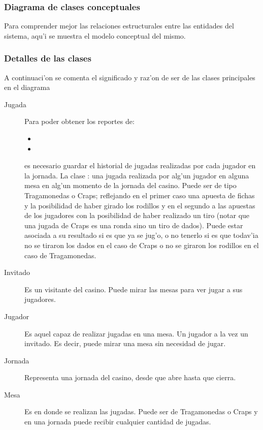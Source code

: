 \subsubsection{Diagrama de clases conceptuales}
Para comprender mejor las relaciones estructurales entre las entidades del sistema, aqu'i se muestra el modelo conceptual del mismo. 



\subsubsection{Detalles de las clases}
A continuaci'on se comenta el significado y raz'on de ser de las clases principales en el diagrama
\begin{description}
\item [Jugada] Para poder obtener los reportes de:
\begin{itemize}
 \item {} 
\item {} 
\end{itemize}
 es necesario guardar el historial de jugadas realizadas por cada jugador en la jornada. 
La clase : una jugada realizada por alg'un jugador en alguna mesa en alg'un momento de la jornada del casino. Puede ser de tipo Tragamonedas o Craps; reflejando en el primer caso una apuesta de fichas y la posibilidad de haber girado los rodillos y en el segundo a las apuestas de los jugadores con la posibilidad de haber realizado un tiro (notar que una jugada de Craps  es una ronda sino un tiro de dados). Puede estar asociada a su resultado si es que ya se jug'o, o no tenerlo si es que todav'ia no se tiraron los dados en el caso de Craps o no se giraron los rodillos en el caso de Tragamonedas. 

\item [Invitado] Es un visitante del casino. Puede mirar las mesas para ver jugar a sus jugadores.

\item [Jugador] Es aquel capaz de realizar jugadas en una mesa. Un jugador  a la vez un invitado. Es decir, puede mirar una mesa sin necesidad de jugar.
\item [Jornada] Representa una jornada del casino, desde que abre hasta que cierra.
\item [Mesa] Es en donde se realizan las jugadas. Puede ser de Tragamonedas o Craps y en una jornada puede recibir cualquier cantidad de jugadas.
\end{description}


